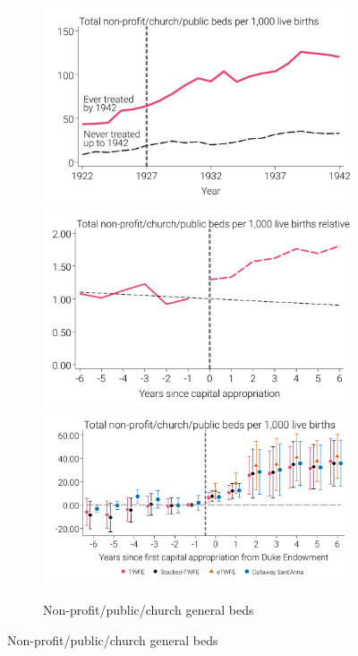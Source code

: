 \documentclass[12pt]{article}
\begin{document}
\begin{landscape}
\begin{figure}
\begin{minipage}{\linewidth}
\begin{subfigure}[b]{0.29\columnwidth}
    \end{subfigure}
    \hfill %
    \begin{subfigure}[b]{0.29\textwidth}
        \centering
        \caption{{Non-profit/public/church general beds}}\label{fig:hosp-beds-likely}
        \includegraphics[width=\linewidth]{../analysis/output/main/figure_2b1_likely_beds_by_year.pdf}
        \includegraphics[width=\linewidth]{../analysis/output/main/figure_2b2_likely_beds_by_event_time.pdf}
        \includegraphics[width=\linewidth]{../analysis/output/main/figure_2b3_likely_beds_first_stage.pdf}

\end{subfigure}
\end{minipage}
\end{figure}
\end{landscape}
\end{document}
